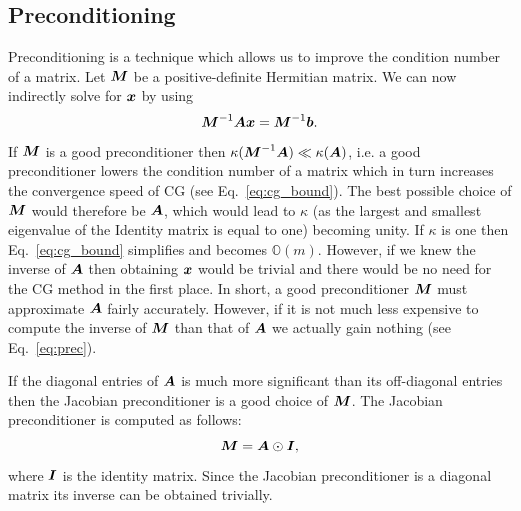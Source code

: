 \documentclass[useAMS,usenatbib]{mn2e}
\newcommand{\bA}{\bmath{A}}
\newcommand{\bM}{\bmath{M}}
\newcommand{\bI}{\bmath{I}}
\newcommand{\bb}{\bmath{b}}
\newcommand{\bx}{\bmath{x}}
\begin{document}
\subsection{Preconditioning}
Preconditioning is a technique which allows us to improve the condition number of a matrix. Let $\bM$ be a positive-definite Hermitian matrix.
We can now indirectly solve for $\bx$ by using 
\begin{equation}
\label{eq:prec}
\bM^{-1}\bA\bx = \bM^{-1}\bb.
\end{equation}
If $\bM$ is a good preconditioner then $\kappa(\bM^{-1}\bA) \ll \kappa(\bA)$, i.e. a good preconditioner lowers the condition number of a matrix which in turn increases the convergence speed 
of CG (see Eq.~\eqref{eq:cg_bound}). The best possible choice of $\bM$ would therefore be $\bA$, which would lead to $\kappa$ (as the largest and smallest eigenvalue of the Identity matrix is equal to one) becoming unity.
If $\kappa$ is one then Eq.~\eqref{eq:cg_bound} simplifies and becomes $\mathbb{O}(m)$. However, if we knew the inverse of $\bA$ then obtaining $\bx$ would be trivial and there would be no need for the CG method in the first place. 
In short, a good preconditioner $\bM$ must approximate $\bA$ fairly accurately. However, if it is not much less expensive to 
compute the inverse of $\bM$ than that of $\bA$ we actually gain nothing (see Eq.~\eqref{eq:prec}).  

If the diagonal entries of $\bA$ is much more significant than its off-diagonal entries then the 
Jacobian preconditioner is a good choice of $\bM$. The Jacobian preconditioner is computed as follows:
\begin{equation}
\bM = \bA\odot\bI, 
\end{equation}
where $\bI$ is the identity matrix. Since the Jacobian preconditioner is a diagonal matrix its inverse can be obtained trivially.
\end{document}
